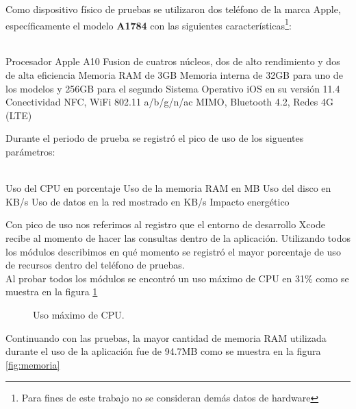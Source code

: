 
Como dispositivo físico de pruebas se utilizaron dos teléfono de la marca Apple, específicamente el modelo \textbf{A1784} con las siguientes características\footnote{Para fines de este trabajo no se consideran demás datos de hardware}: \\ \\

\begin{UClist} 
	\UCli Procesador Apple A10 Fusion de cuatros núcleos, dos de alto rendimiento y dos de alta eficiencia
	\UCli Memoria RAM de 3GB
	\UCli Memoria interna de 32GB para uno de los modelos y 256GB para el segundo
	\UCli Sistema Operativo iOS en su versión 11.4
	\UCli Conectividad NFC, WiFi 802.11 a/b/g/n/ac MIMO, Bluetooth 4.2, Redes 4G (LTE) \\
\end{UClist}

Durante el periodo de prueba se registró el pico de uso de los siguentes parámetros: \\ \\

\begin{UClist} 
	\UCli Uso del CPU en porcentaje
	\UCli Uso de la memoria RAM en MB
	\UCli Uso del disco en KB/s
	\UCli Uso de datos en la red mostrado en KB/s
	\UCli Impacto energético \\
\end{UClist}

Con pico de uso nos referimos al registro que el entorno de desarrollo Xcode recibe al momento de hacer las consultas dentro de la aplicación. Utilizando todos los módulos describimos en qué momento se registró el mayor porcentaje de uso de recursos dentro del teléfono de pruebas. \\

Al probar todos los módulos se encontró un uso máximo de CPU en 31\% como se muestra en la figura \ref{fig:cpu}

    \begin{figure}[h!]
	\begin{center}
		\caption{Uso máximo de CPU. \label{fig:cpu}}
	\end{center}
\end{figure}

Continuando con las pruebas, la mayor cantidad de memoria RAM utilizada durante el uso de la aplicación fue de 94.7MB como se muestra en la figura \ref{fig:memoria}

